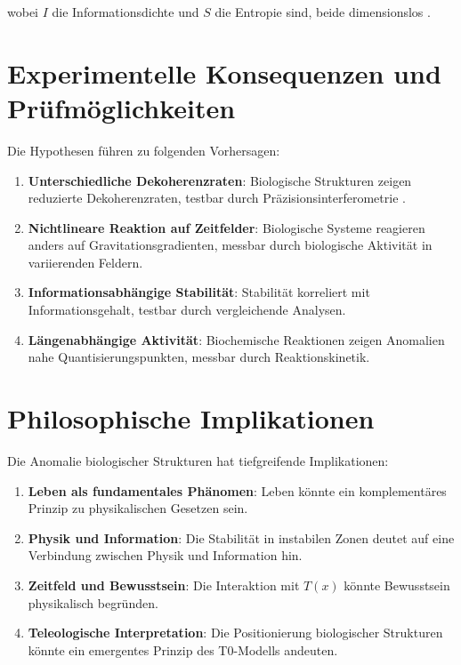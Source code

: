 \documentclass[12pt,a4paper]{article}
\newcommand{\Tfield}{T(x)}
\begin{document}
	wobei $I$ die Informationsdichte und $S$ die Entropie sind, beide dimensionslos \cite{pascher_nateinheiten_2025}.
	
	\section{Experimentelle Konsequenzen und Prüfmöglichkeiten}
	
	Die Hypothesen führen zu folgenden Vorhersagen:
	
	\begin{enumerate}
		\item \textbf{Unterschiedliche Dekoherenzraten}: Biologische Strukturen zeigen reduzierte Dekoherenzraten, testbar durch Präzisionsinterferometrie \cite{pascher_nateinheiten_2025}.
		\item \textbf{Nichtlineare Reaktion auf Zeitfelder}: Biologische Systeme reagieren anders auf Gravitationsgradienten, messbar durch biologische Aktivität in variierenden Feldern.
		\item \textbf{Informationsabhängige Stabilität}: Stabilität korreliert mit Informationsgehalt, testbar durch vergleichende Analysen.
		\item \textbf{Längenabhängige Aktivität}: Biochemische Reaktionen zeigen Anomalien nahe Quantisierungspunkten, messbar durch Reaktionskinetik.
	\end{enumerate}
	
	\section{Philosophische Implikationen}
	
	Die Anomalie biologischer Strukturen hat tiefgreifende Implikationen:
	
	\begin{enumerate}
		\item \textbf{Leben als fundamentales Phänomen}: Leben könnte ein komplementäres Prinzip zu physikalischen Gesetzen sein.
		\item \textbf{Physik und Information}: Die Stabilität in instabilen Zonen deutet auf eine Verbindung zwischen Physik und Information hin.
		\item \textbf{Zeitfeld und Bewusstsein}: Die Interaktion mit $\Tfield$ könnte Bewusstsein physikalisch begründen.
		\item \textbf{Teleologische Interpretation}: Die Positionierung biologischer Strukturen könnte ein emergentes Prinzip des T0-Modells andeuten.
	\end{enumerate}
	
\end{document}
